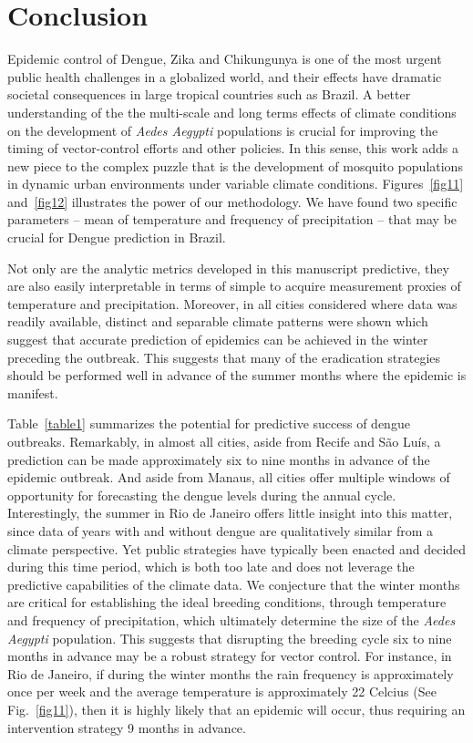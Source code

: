 \documentclass[final,leqno]{siamltexmm2}
\begin{document}
\section*{Conclusion}
Epidemic control of Dengue, Zika and Chikungunya is one of the most urgent public health 
challenges in a globalized world, and their effects have dramatic societal consequences in large 
tropical countries such as Brazil.  A better understanding of the the multi-scale and long terms effects 
of climate conditions on the development of {\em Aedes Aegypti} populations is crucial for improving the timing 
of vector-control efforts and other policies. In this sense, this work adds a new piece to the complex puzzle 
that is the development of mosquito populations in dynamic urban environments under variable climate conditions. Figures~\ref{fig11} and~\ref{fig12} illustrates the power of our methodology. We have found two specific parameters -- mean of temperature and frequency of precipitation -- that may be crucial for Dengue prediction in Brazil.  

Not only are the analytic metrics developed in this manuscript predictive, they are also easily interpretable in terms of simple to acquire measurement proxies of temperature and precipitation.  Moreover, in all cities considered where data was readily available, distinct and separable climate patterns were shown which suggest that accurate
prediction of epidemics can be achieved in the winter preceding the outbreak.  This suggests that
many of the eradication strategies should be performed well in advance of the summer months where
the epidemic is manifest.  

Table~\ref{table1} summarizes the potential for predictive success of 
dengue outbreaks.  Remarkably, in almost all cities, aside from Recife
and S\~ao Lu\'is, a prediction can be made approximately six to nine months in advance of the epidemic outbreak.  And aside from Manaus, all cities offer multiple windows of opportunity for forecasting the dengue levels during the annual cycle.  Interestingly, the summer in Rio de Janeiro offers little insight into this matter, since data of years with and without dengue are qualitatively similar from a climate perspective.     Yet public strategies have typically been enacted and decided during this time period, which is both too late and does not leverage the predictive capabilities of the climate data.   We conjecture that the winter months are critical for establishing the ideal breeding conditions, through temperature and frequency of precipitation, which ultimately determine the size of the {\em Aedes Aegypti} population.  This suggests that disrupting the breeding cycle six to nine months in advance may be a robust strategy for vector control.  For instance, in Rio de Janeiro, if during the winter months the rain frequency is approximately once per week and the average temperature is approximately 22 Celcius (See Fig.~\ref{fig11}), then it is highly likely that an epidemic will occur, thus requiring an intervention strategy 9 months in advance.
\end{document}
